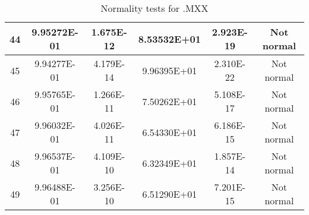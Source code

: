 \begin{table}[h]
\begin{tabular}{|c|c|c|c|c|c|}
		44 & 9.95272E-01 & 1.675E-12 & 8.53532E+01 & 2.923E-19 & Not normal\\\hline
		45 & 9.94277E-01 & 4.179E-14 & 9.96395E+01 & 2.310E-22 & Not normal\\\hline
		46 & 9.95765E-01 & 1.266E-11 & 7.50262E+01 & 5.108E-17 & Not normal\\\hline
		47 & 9.96032E-01 & 4.026E-11 & 6.54330E+01 & 6.186E-15 & Not normal\\\hline
		48 & 9.96537E-01 & 4.109E-10 & 6.32349E+01 & 1.857E-14 & Not normal\\\hline
		49 & 9.96488E-01 & 3.256E-10 & 6.51290E+01 & 7.201E-15 & Not normal\\\hline
	\end{tabular}
	\caption{Normality tests for .MXX}
\end{table}
